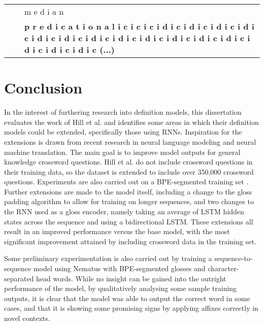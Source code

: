 \documentclass[11pt]{article}
\begin{document}
\begin{spacing}{1}
\begin{table}[!htpb]
\begin{tabular}{p{8cm} l p{5cm}}
                                                                                 &                 & m e d i a n                                                                                                                                                                                                                                                                                                                                                                                                     \\
                                                                                 &                 & \textbf{p r e d i c a t i o n a l i c i c i c i d i c i d i c i d i c i d i c i d i c i d i c i d i c i d i c i d i c i d i c i d i c i d i c i d i c i d i c i d i c (...)}
\end{tabular}
\label{6_epoch_char}
\end{table}

\newpage

\section{Conclusion}
In the interest of furthering research into definition models, this dissertation evaluates the work of Hill et al. \citeyear{hill2015learning} and identifies some areas in which their definition models could be extended, specifically those using RNNs. Inspiration for the extensions is drawn from recent research in neural language modeling and neural machine translation. The main goal is to improve model outputs for general knowledge crossword questions. Hill et al. \citeyear{hill2015learning} do not include crossword questions in their training data, so the dataset is extended to include over 350,000 crossword questions. Experiments are also carried out on a BPE-segmented training set \cite{sennrich2015neural}. Further extensions are made to the model itself, including a change to the gloss padding algorithm to allow for training on longer sequences, and two changes to the RNN used as a gloss encoder, namely taking an average of LSTM hidden states across the sequence and using a bidirectional LSTM. These extensions all result in an improved performance versus the base model, with the most significant improvement attained by including crossword data in the training set. 

Some preliminary experimentation is also carried out by training a sequence-to-sequence model using Nematus \cite{sennrich-EtAl:2017:EACLDemo} with BPE-segmented glosses and character-separated head words. While no insight can be gained into the outright performance of the model, by qualitatively analysing some sample training outputs, it is clear that the model was able to output the correct word in some cases, and that it is showing some promising signs by applying affixes correctly in novel contexts.


\end{spacing}
\end{document}
